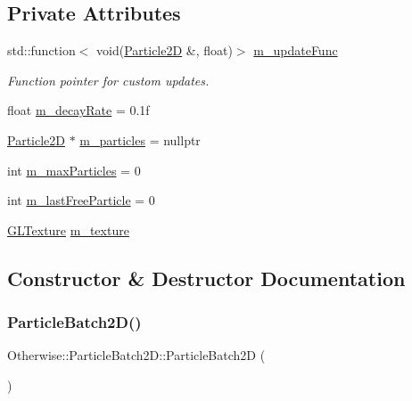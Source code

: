 \subsection*{Private Attributes}
\begin{DoxyCompactItemize}
\item 
std\+::function$<$ void(\hyperlink{class_otherwise_1_1_particle2_d}{Particle2D} \&, float)$>$ \hyperlink{class_otherwise_1_1_particle_batch2_d_a6eed0d4ded677fb9044e03f295a6d277}{m\+\_\+update\+Func}
\begin{DoxyCompactList}\small\item\em Function pointer for custom updates. \end{DoxyCompactList}\item 
float \hyperlink{class_otherwise_1_1_particle_batch2_d_aea30921077aaeab4bc68b8dac3d843d2}{m\+\_\+decay\+Rate} = 0.\+1f
\item 
\hyperlink{class_otherwise_1_1_particle2_d}{Particle2D} $\ast$ \hyperlink{class_otherwise_1_1_particle_batch2_d_a4077a59a77153fea4f721e64e0edcb32}{m\+\_\+particles} = nullptr
\item 
int \hyperlink{class_otherwise_1_1_particle_batch2_d_a76764d1b85680eb9ef9e81f719b30194}{m\+\_\+max\+Particles} = 0
\item 
int \hyperlink{class_otherwise_1_1_particle_batch2_d_a5ff7e1dd8f9e8e93d0d9286f343c939a}{m\+\_\+last\+Free\+Particle} = 0
\item 
\hyperlink{struct_otherwise_1_1_g_l_texture}{G\+L\+Texture} \hyperlink{class_otherwise_1_1_particle_batch2_d_aca86956dd63e0dc63f86d28e1af35fbe}{m\+\_\+texture}
\end{DoxyCompactItemize}


\subsection{Constructor \& Destructor Documentation}
\mbox{\label{class_otherwise_1_1_particle_batch2_d_ab800f725b2e8630ac122bbf4cf164fe5}} 
\subsubsection{\texorpdfstring{Particle\+Batch2\+D()}{ParticleBatch2D()}}
{\footnotesize\ttfamily Otherwise\+::\+Particle\+Batch2\+D\+::\+Particle\+Batch2D (\begin{DoxyParamCaption}{ }\end{DoxyParamCaption})}


